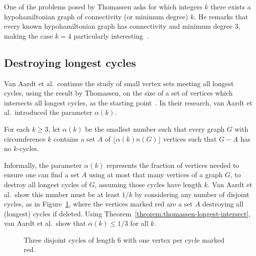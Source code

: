 One of the problems posed by Thomassen asks for which integers $k$ there exists a hypohamiltonian graph of connectivity (or minimum degree) $k$. He remarks that every known hypohamiltonian graph has connectivity and minimum degree $3$, making the case $k=4$ particularly interesting~\cite{article:thomassen}.

\subsection{Destroying longest cycles}

Van Aardt et al.\ continue the study of small vertex sets meeting all longest cycles, using the result by Thomassen, on the size of a set of vertices which intersects all longest cycles, as the starting point~\cite{article:van-aardt}. In their research, van Aardt et al.\ introduced the parameter $\alpha(k)$.

\begin{definition}
  For each $k \ge 3$, let $\alpha(k)$ be the smallest number such that every graph $G$ with circumference $k$ contains a set $A$ of $\lfloor \alpha(k)n(G)\rfloor$ vertices such that $G - A$ has no $k$-cycles.
\end{definition}

Informally, the parameter $\alpha(k)$ represents the fraction of vertices needed to ensure one can find a set $A$ using at most that many vertices of a graph $G$, to destroy all longest cycles of $G$, assuming those cycles have length $k$. Van Aardt et al.\ show this number must be at least $1/k$ by considering any number of disjoint cycles, as in Figure~\ref{fig:disjoint-cycles}, where the vertices marked red are a set $A$ destroying all (longest) cycles if deleted. Using Theorem~\ref{theorem:thomassen-longest-intersect}, van Aardt et al.\ show that $\alpha(k) \le 1/3$ for all $k$.

\begin{figure}
  \centering
  \caption{Three disjoint cycles of length 6 with one vertex per cycle marked red.}
  \label{fig:disjoint-cycles}
\end{figure}

